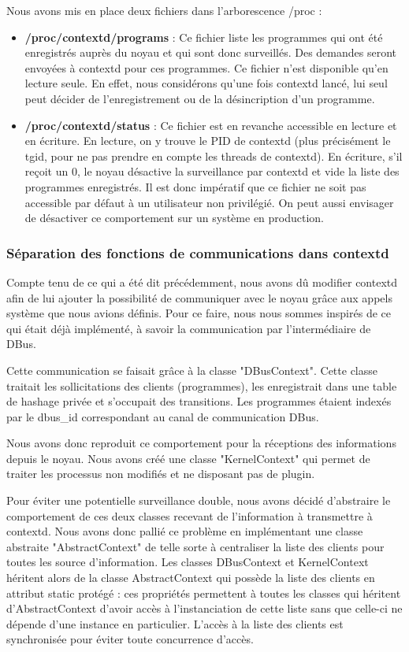 \documentclass[pdftex,a4paper,titlepage,11pt]{article}
\begin{document}
Nous avons mis en place deux fichiers dans l'arborescence /proc :

	\begin{itemize}
		\item \textbf{/proc/contextd/programs} : Ce fichier liste les programmes qui ont été enregistrés auprès du noyau et qui sont donc surveillés. Des demandes seront envoyées à contextd pour ces programmes. Ce fichier n'est disponible qu'en lecture seule. En effet, nous considérons qu'une fois contextd lancé, lui seul peut décider de l'enregistrement ou de la désincription d'un programme.
		\item \textbf{/proc/contextd/status} : Ce fichier est en revanche accessible en lecture et en écriture. En lecture, on y trouve le PID de contextd (plus précisément le tgid, pour ne pas prendre en compte les threads de contextd). En écriture, s'il reçoit un 0, le noyau désactive la surveillance par contextd et vide la liste des programmes enregistrés. Il est donc impératif que ce fichier ne soit pas accessible par défaut à un utilisateur non privilégié. On peut aussi envisager de désactiver ce comportement sur un système en production.
	\end{itemize}

\subsubsection{Séparation des fonctions de communications dans contextd}

Compte tenu de ce qui a été dit précédemment, nous avons dû modifier contextd afin de lui ajouter la possibilité de communiquer avec le noyau grâce aux appels système que nous avions définis. Pour ce faire, nous nous sommes inspirés de ce qui était déjà implémenté, à savoir la communication par l'intermédiaire de DBus.

Cette communication se faisait grâce à la classe "DBusContext". Cette classe traitait les sollicitations des clients (programmes), les enregistrait dans une table de hashage privée et s'occupait des transitions. Les programmes étaient indexés par le dbus\_id correspondant au canal de communication DBus.

Nous avons donc reproduit ce comportement pour la réceptions des informations depuis le noyau. Nous avons créé une classe "KernelContext" qui permet de traiter les processus non modifiés et ne disposant pas de plugin.

Pour éviter une potentielle surveillance double, nous avons décidé d'abstraire le comportement de ces deux classes recevant de l'information à transmettre à contextd. Nous avons donc pallié ce problème en implémentant une classe abstraite "AbstractContext" de telle sorte à centraliser la liste des clients pour toutes les source d'information. Les classes DBusContext et KernelContext héritent alors de la classe AbstractContext qui possède la liste des clients en attribut static protégé : ces propriétés permettent à toutes les classes qui héritent d'AbstractContext d'avoir accès à l'instanciation de cette liste sans que celle-ci ne dépende d'une instance en particulier. L'accès à la liste des clients est synchronisée pour éviter toute concurrence d'accès.
\end{document}
